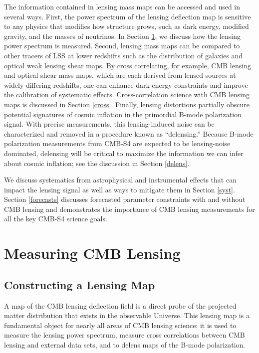 \documentclass{tcibook}
\begin{document}
The information contained in lensing mass maps can be accessed and used in several ways.
First, the power spectrum of the lensing deflection map is sensitive to any physics that modifies how structure grows, such as dark energy, modified gravity, and the masses of neutrinos.
In Section \ref{measuringLensing}, we discuss how the lensing power spectrum is measured.
Second, lensing mass maps can be compared to other tracers of LSS at lower redshifts such as the distribution of galaxies and optical weak lensing shear maps.  By cross correlating, for example, CMB lensing and optical shear mass maps, which are each derived from lensed sources at widely differing redshifts, one can enhance dark energy constraints and improve the calibration of systematic effects.
Cross-correlation science with CMB lensing maps is discussed in Section \ref{cross}.
Finally, lensing distortions partially obscure potential signatures of cosmic inflation in the primordial B-mode polarization signal.
With precise measurements, this lensing-induced noise can be characterized and removed in a procedure known as ``delensing.''
Because B-mode polarization measurements from CMB-S4 are expected to be lensing-noise dominated, delensing will be critical to maximize the information we can infer about cosmic inflation; see the discussion in Section \ref{delens}.

We discuss systematics from astrophysical and instrumental effects that can impact the lensing signal as well as ways to mitigate them in Section \ref{syst}.  Section \ref{forecasts} discusses forecasted parameter constraints with and without CMB lensing and demonstrates the importance of CMB lensing measurements for all the key CMB-S4 science goals.  


\section{Measuring CMB Lensing}\label{measuringLensing}

\subsection{Constructing a Lensing Map}\label{kappaMap}

A map of the CMB lensing deflection field is a direct probe of the projected matter distribution that exists in the observable Universe. This lensing map is a fundamental object for nearly all areas of CMB lensing science: it is used to measure the lensing power spectrum, measure cross correlations between CMB lensing and external data sets, and to delens maps of the B-mode polarization.  
\end{document}

